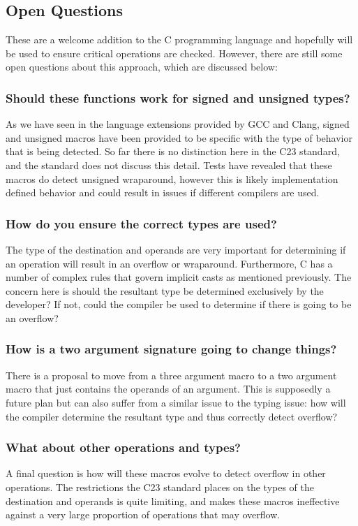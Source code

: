 \subsection{Open Questions}

These are a welcome addition to the C programming language and hopefully will be used to ensure critical operations are checked. However, there are still some open questions about this approach, which are discussed below:

\subsubsection{Should these functions work for signed and unsigned types?}
As we have seen in the language extensions provided by GCC and Clang, signed and unsigned macros have been provided to be specific with the type of behavior that is being detected. So far there is no distinction here in the C23 standard, and the standard does not discuss this detail. Tests have revealed that these macros do detect unsigned wraparound, however this is likely implementation defined behavior and could result in issues if different compilers are used.

\subsubsection{How do you ensure the correct types are used?}

The type of the destination and operands are very important for determining if an operation will result in an overflow or wraparound. Furthermore, C has a number of complex rules that govern implicit casts as mentioned previously. The concern here is should the resultant type be determined exclusively by the developer? If not, could the compiler be used to determine if there is going to be an overflow?

\subsubsection{How is a two argument signature going to change things?}

There is a proposal to move from a three argument macro to a two argument macro that just contains the operands of an argument. This is supposedly a future plan but can also suffer from a similar issue to the typing issue: how will the compiler determine the resultant type and thus correctly detect overflow?

\subsubsection{What about other operations and types?}

A final question is how will these macros evolve to detect overflow in other operations. The restrictions the C23 standard places on the types of the destination and operands is quite limiting, and makes these macros ineffective against a very large proportion of operations that may overflow.